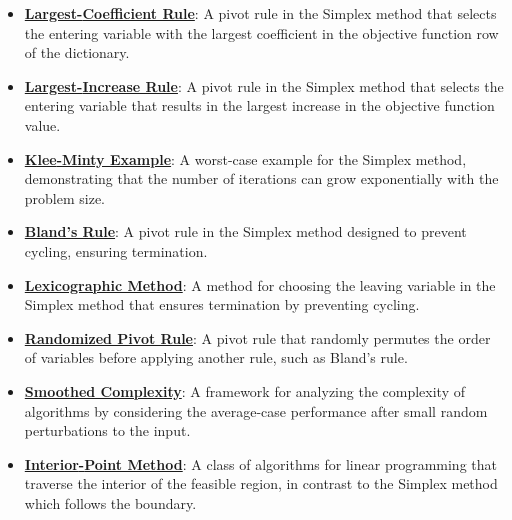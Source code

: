 \documentclass{article}%
\begin{document}
\begin{itemize}[leftmargin=*]%
\item \href{https://www.math.purdue.edu/~yipn/421/2024-09-05-SimplexEfficiency.pdf#page=4}{\textbf{Largest{-}Coefficient Rule}}: A pivot rule in the Simplex method that selects the entering variable with the largest coefficient in the objective function row of the dictionary.%
\item \href{https://www.math.purdue.edu/~yipn/421/2024-09-05-SimplexEfficiency.pdf#page=6}{\textbf{Largest{-}Increase Rule}}: A pivot rule in the Simplex method that selects the entering variable that results in the largest increase in the objective function value.%
\item \href{https://www.math.purdue.edu/~yipn/421/2024-09-05-SimplexEfficiency.pdf#page=2}{\textbf{Klee{-}Minty Example}}: A worst-case example for the Simplex method, demonstrating that the number of iterations can grow exponentially with the problem size.%
\item \href{https://www.math.purdue.edu/~yipn/421/2024-09-05-SimplexEfficiency.pdf#page=10}{\textbf{Bland's Rule}}: A pivot rule in the Simplex method designed to prevent cycling, ensuring termination.%
\item \href{https://www.math.purdue.edu/~yipn/421/2024-09-05-SimplexEfficiency.pdf#page=10}{\textbf{Lexicographic Method}}: A method for choosing the leaving variable in the Simplex method that ensures termination by preventing cycling.%
\item \href{https://www.math.purdue.edu/~yipn/421/2024-09-05-SimplexEfficiency.pdf#page=10}{\textbf{Randomized Pivot Rule}}: A pivot rule that randomly permutes the order of variables before applying another rule, such as Bland's rule.%
\item \href{https://www.math.purdue.edu/~yipn/421/2024-09-05-SimplexEfficiency.pdf#page=11}{\textbf{Smoothed Complexity}}: A framework for analyzing the complexity of algorithms by considering the average-case performance after small random perturbations to the input.%
\item \href{https://www.math.purdue.edu/~yipn/421/2024-09-05-SimplexEfficiency.pdf#page=12}{\textbf{Interior{-}Point Method}}: A class of algorithms for linear programming that traverse the interior of the feasible region, in contrast to the Simplex method which follows the boundary.%
\end{itemize}%
\end{document}
